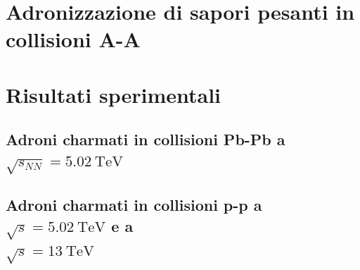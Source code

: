 \section{Adronizzazione di sapori pesanti in collisioni A-A}

\section{Risultati sperimentali}

\subsection{Adroni charmati in collisioni Pb-Pb a $\sqrt{s_{NN}} = \qty{5.02}{\tera \eV}$}

\subsection{Adroni charmati in collisioni p-p a $\sqrt{s} = \qty{5.02}{\tera \eV}$ e a \\ $\sqrt{s} = \qty{13}{\tera \eV}$}